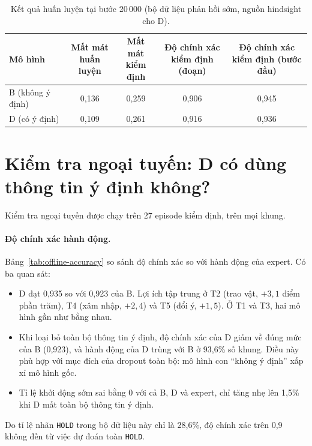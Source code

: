 \begin{table}[htbp]
  \centering
  \caption{Kết quả huấn luyện tại bước 20\,000 (bộ dữ liệu phản hồi sớm, nguồn hindsight cho D).}
  \label{tab:train-results}
  \begin{tabular}{@{}lcccc@{}}
    \toprule
    \textbf{Mô hình} & \makecell{Mất mát\\huấn luyện} & \makecell{Mất mát\\kiểm định} & \makecell{Độ chính xác\\kiểm định (đoạn)} & \makecell{Độ chính xác\\kiểm định (bước đầu)} \\
    \midrule
    B (không ý định) & 0,136 & 0,259 & 0,906 & 0,945 \\
    D (có ý định)    & 0,109 & 0,261 & 0,916 & 0,936 \\
    \bottomrule
  \end{tabular}
\end{table}

\section{Kiểm tra ngoại tuyến: D có dùng thông tin ý định không?}
\label{sec:offline-results}

Kiểm tra ngoại tuyến được chạy trên 27 episode kiểm định, trên mọi khung.

\paragraph{Độ chính xác hành động.} Bảng~\ref{tab:offline-accuracy} so sánh độ chính xác so với hành động của expert. Có ba quan sát:
\begin{itemize}
  \item D đạt 0,935 so với 0,923 của B. Lợi ích tập trung ở T2 (trao vật, $+3{,}1$ điểm phần trăm), T4 (xâm nhập, $+2{,}4$) và T5 (đổi ý, $+1{,}5$). Ở T1 và T3, hai mô hình gần như bằng nhau.
  \item Khi loại bỏ toàn bộ thông tin ý định, độ chính xác của D giảm về đúng mức của B (0,923), và hành động của D trùng với B ở 93,6\% số khung. Điều này phù hợp với mục đích của dropout toàn bộ: mô hình con ``không ý định'' xấp xỉ mô hình gốc.
  \item Tỉ lệ khởi động sớm sai bằng 0 với cả B, D và expert, chỉ tăng nhẹ lên 1,5\% khi D mất toàn bộ thông tin ý định.
\end{itemize}
Do tỉ lệ nhãn \texttt{HOLD} trong bộ dữ liệu này chỉ là 28,6\%, độ chính xác trên 0,9 không đến từ việc dự đoán toàn \texttt{HOLD}.

